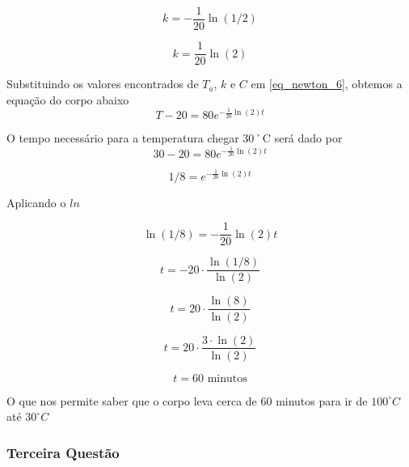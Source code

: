 \documentclass[11pt]{article}
\begin{document}
\begin{equation*}
    k = -\frac{1}{20}\ln(1/2)
\end{equation*}

\begin{equation}
    \label{eq_newton_achou_k_b}
    k = \frac{1}{20}\ln(2)
\end{equation}

Substituindo os valores encontrados de \(T_{a}\), \(k\) e \(C\) em
\eqref{eq_newton_6}, obtemos a equação do corpo abaixo \begin{equation}
    \label{eq_newton_final_b}
    T - 20 = 80e^{-\frac{1}{20}\ln(2)t}
\end{equation}

O tempo necessário para a temperatura chegar 30˚C será dado por
\begin{equation*}
    \label{eq_newton_final_b_1}
    30 - 20 = 80e^{-\frac{1}{20}\ln(2)t}
\end{equation*}

\begin{equation*}
    \label{eq_newton_final_b_2}
    1/8 = e^{-\frac{1}{20}\ln(2)t}
\end{equation*}

Aplicando o \(ln\)

\begin{equation*}
    \label{eq_newton_final_b_3}
    \ln(1/8) = -\frac{1}{20}\ln(2)t
\end{equation*}

\begin{equation*}
    \label{eq_newton_final_b_4}
    t = -20 \cdot \frac{\ln(1/8)}{\ln(2)}
\end{equation*}

\begin{equation*}
    t = 20 \cdot \frac{\ln(8)}{\ln(2)}
\end{equation*}

\begin{equation*}
    t = 20 \cdot \frac{3 \cdot \ln(2)}{\ln(2)}
\end{equation*}

\begin{equation}
    \label{eq_newton_achou_t}
    t = 60 \text{ minutos}
\end{equation}

O que nos permite saber que o corpo leva cerca de 60 minutos para ir de
\(100^{\circ}C\) até \(30^{\circ}C\)

    \hypertarget{terceira-questuxe3o}{%
\subsubsection{Terceira Questão}\label{terceira-questuxe3o}}
\end{document}
